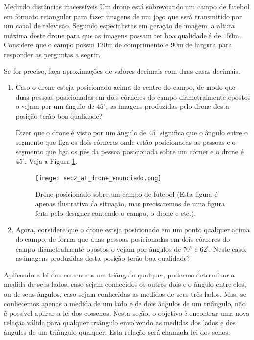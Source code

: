 \begin{task}{Medindo distâncias inacessíveis}
Um drone está sobrevoando um campo de futebol em formato retangular para fazer imagens de um jogo que será transmitido por um canal de televisão. Segundo especialistas em geração de imagem, a altura máxima deste drone para que as imagens possam ter boa qualidade é de $150$m. Considere que o campo possui $120$m de comprimento e $90$m de largura para responder as perguntas a seguir.

Se for preciso, faça aproximações de valores decimais com duas casas decimais.

\begin{enumerate}
    \item{}
    Caso o drone esteja posicionado acima do centro do campo, de modo que duas pessoas posicionadas em dois córneres do campo diametralmente opostos o vejam por um ângulo de $45^\circ$, as imagens produzidas pelo drone desta posição terão boa qualidade?
    
    Dizer que o drone é visto por um ângulo de $45^\circ$ significa que o ângulo entre o segmento que liga os dois córneres onde estão posicionadas as pessoas e o segmento que liga os pés da pessoa posicionada sobre um córner e o drone é $45^\circ$. Veja a Figura \ref{sec2_leidossenos_atdrone_fig1}.
    \begin{figure}[H]
    \centering
    \texttt{[image: sec2\_at\_drone\_enunciado.png]}
    \caption{Drone posicionado sobre um campo de futebol (Esta figura é apenas ilustrativa da situação, mas precisaremos de uma figura feita pelo designer contendo o campo, o drone e etc.). 
    }
    \label{sec2_leidossenos_atdrone_fig1}
\end{figure}

    
    \item{}
    Agora, considere que o drone esteja posicionado em um ponto qualquer acima do campo, de forma que duas pessoas posicionadas em dois córneres do campo diametralmente opostos o vejam por ângulos de $70^\circ$ e $62^\circ$. Neste caso, as imagens produzidas desta posição terão boa qualidade? 
\end{enumerate}
\end{task}


Aplicando a lei dos cossenos a um triângulo qualquer, podemos determinar a medida de seus lados, caso sejam conhecidos os outros dois e o ângulo entre eles, ou de seus ângulos, caso sejam conhecidas as medidas de seus três lados. Mas, se conhecemos apenas a medida de um lado e de dois ângulos de um triângulo, não é possível aplicar a lei dos cossenos. Nesta seção, o objetivo é encontrar uma nova relação válida para qualquer triângulo envolvendo as medidas dos lados e dos ângulos de um triângulo qualquer.  Esta relação será chamada lei dos senos.

